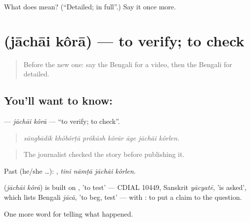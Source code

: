 \begin{tcolorbox}[breakable,colback=teal!4,colframe=teal!35!black,title={Before you move on}]
What does  mean? (\textquotedblleft{}Detailed; in full\textquotedblright{}.) Say it once more.
\end{tcolorbox}
\section[\texorpdfstring{\bn{যাচাই} \bn{করা} (jāchāi kôrā)}{যাচাই করা (jāchāi kôrā)}]{  (jāchāi kôrā) — to verify; to check}

\label{lesson:BN-C301-jachai-kora}



\begin{quote}
Before the new one: say the Bengali for a video, then the Bengali for detailed.
\end{quote}

\subsection*{You'll want to know:  }
\textbf{ } — \emph{jāchāi kôrā} — \textquotedblleft{}to verify; to check\textquotedblright{}.

\begin{quote}
      
\end{quote}

\begin{quote}
\emph{sāngbādik khôbôrṭā prôkāsh kôrār āge jāchāi kôrlen.}
\end{quote}

\begin{quote}
The journalist checked the story before publishing it.
\end{quote}

Past (he/she …):    , \emph{tini nāmṭā jāchāi kôrlen}.

\begin{cousinweb}
\textbf{ } (\emph{jāchāi kôrā}) is built on , 'to test' — CDIAL 10449, Sanskrit \emph{yācyatē}, 'is asked', which lists Bengali \emph{jācā}, 'to beg, test' — with : to put a claim to the question.
\end{cousinweb}

\begin{grammarlens}[title={What you've built}]
One more word for telling what happened.
\end{grammarlens}

